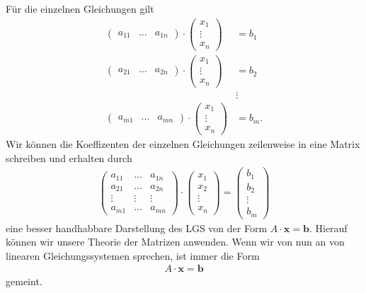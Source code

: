 Für die einzelnen Gleichungen gilt 
\begin{align*}
\begin{pmatrix}
a_{11} & \dots & a_{1n}
\end{pmatrix}
\cdot
\begin{pmatrix}
x_1 \\
\vdots\\
x_n
\end{pmatrix}
&=
b_1\\
\begin{pmatrix}
a_{21} & \dots & a_{2n}
\end{pmatrix}
\cdot
\begin{pmatrix}
x_1 \\
\vdots\\
x_n
\end{pmatrix}
&=
b_2\\
&\vdots\\
\begin{pmatrix}
a_{m1} & \dots & a_{mn}
\end{pmatrix}
\cdot
\begin{pmatrix}
x_1 \\
\vdots\\
x_n
\end{pmatrix}
&=
b_m.
\end{align*}
Wir können die Koeffizenten der einzelnen Gleichungen zeilenweise in eine Matrix schreiben und erhalten durch
\begin{align*}
\begin{pmatrix}
a_{11} & \dots & a_{1n} \\
a_{21} & \dots & a_{2n}\\
\vdots & \vdots & \vdots\\
a_{m1} & \dots & a_{mn}
\end{pmatrix}
\cdot
\begin{pmatrix}
x_1\\
x_2\\
\vdots\\
x_n
\end{pmatrix}
= 
\begin{pmatrix}
b_1\\
b_2\\
\vdots\\
b_m
\end{pmatrix}
\end{align*}
eine besser handhabbare Darstellung des LGS von der Form $A \cdot \textbf{x} = \textbf{b}$.
Hierauf können wir unsere Theorie der Matrizen anwenden. Wenn wir von nun an von linearen Gleichungssystemen sprechen, ist immer die Form
\begin{align*}
A \cdot \textbf{x} = \textbf{b}
\end{align*}
gemeint.


